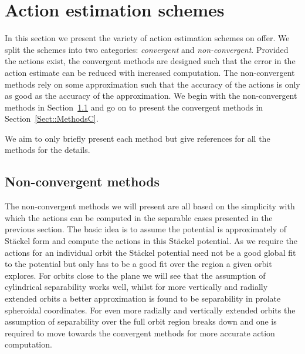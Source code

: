 \documentclass[useAMS,usenatbib,fleqn,a4paper]{mn2e}
\begin{document}
\section{Action estimation schemes}\label{Methods}
In this section we present the variety of action estimation schemes on offer. We split the schemes into two categories: \emph{convergent} and \emph{non-convergent}. Provided the actions exist, the convergent methods are designed such that the error in the action estimate can be reduced with increased computation. The non-convergent methods rely on some approximation such that the accuracy of the actions is only as good as the accuracy of the approximation. We begin with the non-convergent methods in Section~\ref{Sect::MethodsNC} and go on to present the convergent methods in Section~\ref{Sect::MethodsC}.

We aim to only briefly present each method but give references for all the methods for the details.

\subsection{Non-convergent methods}\label{Sect::MethodsNC}
The non-convergent methods we will present are all based on the simplicity with which the actions can be computed in the separable cases presented in the previous section. The basic idea is to assume the potential is approximately of St\"ackel form and compute the actions in this St\"ackel potential. As we require the actions for an individual orbit the St\"ackel potential need not be a good global fit to the potential but only has to be a good fit over the region a given orbit explores. For orbits close to the plane we will see that the assumption of cylindrical separability works well, whilst for more vertically and radially extended orbits a better approximation is found to be separability in prolate spheroidal coordinates. For even more radially and vertically extended orbits the assumption of separability over the full orbit region breaks down and one is required to move towards the convergent methods for more accurate action computation.
\end{document}
